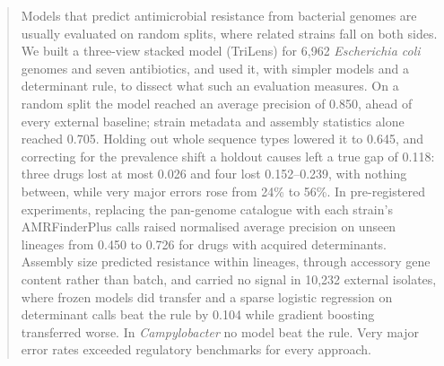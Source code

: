 \begin{abstract}
Models that predict antimicrobial resistance from bacterial genomes are usually evaluated on random
splits, where related strains fall on both sides. We built a three-view stacked model (TriLens) for
6,962 \textit{Escherichia coli} genomes and seven antibiotics, and used it, with simpler models and
a determinant rule, to dissect what such an evaluation measures. On a random split the model
reached an average precision of 0.850, ahead of every external baseline; strain metadata and
assembly statistics alone reached 0.705. Holding out whole sequence types lowered it to 0.645, and
correcting for the prevalence shift a holdout causes left a true gap of 0.118: three drugs lost at
most 0.026 and four lost 0.152--0.239, with nothing between, while very major errors rose from 24\%
to 56\%. In pre-registered experiments, replacing the pan-genome catalogue with each strain's
AMRFinderPlus calls raised normalised average precision on unseen lineages from 0.450 to 0.726 for
drugs with acquired determinants. Assembly size predicted resistance within lineages, through
accessory gene content rather than batch, and carried no signal in 10,232 external isolates, where
frozen models did transfer and a sparse logistic regression on determinant calls beat the rule by
0.104 while gradient boosting transferred worse. In \textit{Campylobacter} no model beat the rule.
Very major error rates exceeded regulatory benchmarks for every approach.
\end{abstract}

